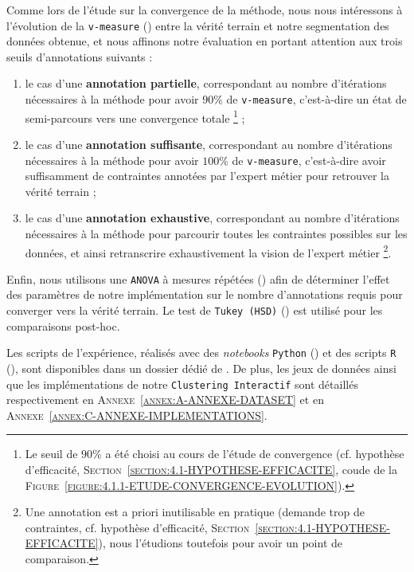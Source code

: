 			Comme lors de l'étude sur la convergence de la méthode, nous nous intéressons à l'évolution de la \texttt{v-measure} (\cite{rosenberg-hirschberg:2007:vmeasure-conditional-entropybased}) entre la vérité terrain et notre segmentation des données obtenue, et nous affinons notre évaluation en portant attention aux trois seuils d'annotations suivants :
			\begin{enumerate}
				\item le cas d'une \textbf{annotation partielle}, correspondant au nombre d'itérations nécessaires à la méthode pour avoir $90$\% de \texttt{v-measure}, c'est-à-dire un état de semi-parcours vers une convergence totale \footnote{
					Le seuil de $90$\% a été choisi au cours de l'étude de convergence (cf. hypothèse d'efficacité, \textsc{Section~\ref{section:4.1-HYPOTHESE-EFFICACITE}}, coude de la \textsc{Figure~\ref{figure:4.1.1-ETUDE-CONVERGENCE-EVOLUTION}}).
				} ;
				\item le cas d'une \textbf{annotation suffisante}, correspondant au nombre d'itérations nécessaires à la méthode pour avoir $100$\% de \texttt{v-measure}, c'est-à-dire avoir suffisamment de contraintes annotées par l'expert métier pour retrouver la vérité terrain ;
				\item le cas d'une \textbf{annotation exhaustive}, correspondant au nombre d'itérations nécessaires à la méthode pour parcourir toutes les contraintes possibles sur les données, et ainsi retranscrire exhaustivement la vision de l'expert métier \footnote{
					Une annotation est a priori inutilisable en pratique (demande trop de contraintes, cf. hypothèse d'efficacité, \textsc{Section~\ref{section:4.1-HYPOTHESE-EFFICACITE}}), nous l'étudions toutefois pour avoir un point de comparaison.
				}.
			\end{enumerate}
			
			Enfin, nous utilisons une \texttt{ANOVA} à mesures répétées (\cite{girden:1992:anova}) afin de déterminer l'effet des paramètres de notre implémentation sur le nombre d'annotations requis pour converger vers la vérité terrain. Le test de \texttt{Tukey (HSD)} (\cite{tukey:1949:comparing-individual-means}) est utilisé pour les comparaisons post-hoc.
			
			\begin{leftBarInformation}
				Les scripts de l'expérience, réalisés avec des \textit{notebooks} \texttt{Python} (\cite{van-rossum-drake:2009:python-reference-manual}) et des scripts \texttt{R} (\cite{r-core-team:2017:language-environment-statistical}), sont disponibles dans un dossier dédié de \cite{schild:2021:cognitivefactory-interactiveclusteringcomparativestudy}.
				De plus, les jeux de données ainsi que les implémentations de notre \texttt{Clustering Interactif} sont détaillés respectivement en \textsc{Annexe~\ref{annex:A-ANNEXE-DATASET}} et en \textsc{Annexe~\ref{annex:C-ANNEXE-IMPLEMENTATIONS}}.
			\end{leftBarInformation}

